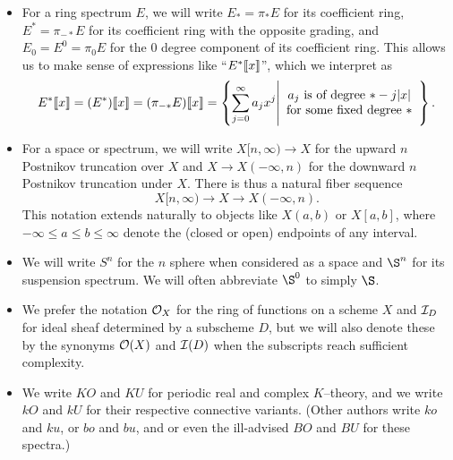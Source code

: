 \begin{itemize}
\item For a ring spectrum $E$, we will write $E_* = \pi_* E$ for its coefficient ring, $E^* = \pi_{-*} E$ for its coefficient ring with the opposite grading, and $E_0 = E^0 = \pi_0 E$ for the $0${\th} degree component of its coefficient ring.  This allows us to make sense of expressions like ``$E^*\llbracket{x}\rrbracket$'', which we interpret as \[E^*\llbracket{x}\rrbracket = (E^*)\llbracket{x}\rrbracket = (\pi_{-*} E)\llbracket{x}\rrbracket = \left\{ \sum_{j=0}^\infty a_j x^j \middle| \begin{array}{c} \text{$a_j$ is of degree $* -j|x|$} \\ \text{for some fixed degree $*$} \end{array} \right\}.\]
\item For a space or spectrum, we will write $X[n, \infty) \to X$ for the upward $n${\th} Postnikov truncation over $X$ and $X \to X(-\infty, n)$ for the downward $n${\th} Postnikov truncation under $X$.  There is thus a natural fiber sequence \[X[n, \infty) \to X \to X(-\infty, n).\]  This notation extends naturally to objects like $X(a, b)$ or $X[a, b]$, where $-\infty \le a \le b \le \infty$ denote the (closed or open) endpoints of any interval.
\item We will write $S^n$ for the $n${\th} sphere when considered as a space and $\S^n$ for its suspension spectrum.  We will often abbreviate $\S^0$ to simply $\S$.
\item We prefer the notation $\mathcal{O}_X$ for the ring of functions on a scheme $X$ and $\mathcal{I}_D$ for ideal sheaf determined by a subscheme $D$, but we will also denote these by the synonyms $\mathcal{O}(X)$ and $\mathcal{I}(D)$ when the subscripts reach sufficient complexity.
\item We write $KO$ and $KU$ for periodic real and complex $K$--theory, and we write $kO$ and $kU$ for their respective connective variants.  (Other authors write $ko$ and $ku$, or $bo$ and $bu$, and or even the ill-advised $BO$ and $BU$ for these spectra.)
\end{itemize}
